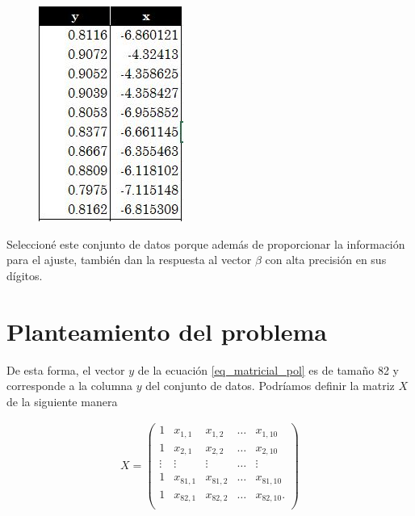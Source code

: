 \begin{figure}[h]
\begin{center}
\includegraphics[scale=0.5]{Imagenes/header_filip.JPG}
  \label{header_filip}
\end{center}
\end{figure}


Seleccioné este conjunto de datos porque además de proporcionar la información para el ajuste, también dan la respuesta al vector $\beta$ con alta precisión en sus dígitos. 

\section{Planteamiento del problema}

De esta forma, el vector $y$ de la ecuación \ref{eq_matricial_pol} es de tamaño 82 y corresponde a la columna $y$ del conjunto de datos.
Podríamos definir la matriz $X$ de la siguiente manera

\begin{equation*}
    \begin{aligned}
    X = 
    \begin{pmatrix}
    1 & x_{1,1} & x_{1,2} & \dots & x_{1, 10}  \\
    1 & x_{2,1} & x_{2, 2} & \dots & x_{2, 10} \\
    \vdots & \vdots & \vdots & \dots & \vdots \\
    1 & x_{81,1} & x_{81, 2} & \dots & x_{81, 10} \\
    1 & x_{82,1} & x_{82, 2} & \dots & x_{82, 10}. \\
    \end{pmatrix}
    \end{aligned}
\end{equation*} 

